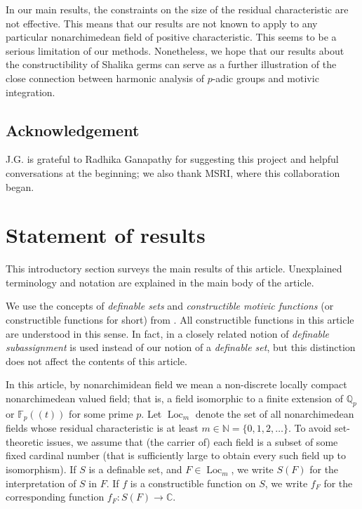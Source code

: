 \documentclass[12pt]{amsart}
\newcommand{\op}[1]{\operatorname{#1}}
\newcommand{\ring}[1]{{\mathbb #1}}
\theoremstyle{plain}
\theoremstyle{definition}
\begin{document}
In our main results, the constraints on the size of the residual
characteristic are not effective.  This means that our results are not
known to apply to any particular nonarchimedean field of positive
characteristic. This seems to be a serious limitation of our methods.
Nonetheless, we hope that our results about the constructibility of
Shalika germs can serve as a further illustration of the close
connection between harmonic analysis of $p$-adic groups and motivic
integration.

\subsection{Acknowledgement} J.G. is grateful to Radhika Ganapathy for
suggesting this project and helpful conversations at the beginning; we
also thank MSRI, where this collaboration began.

\section{Statement of results}


This introductory section surveys the main results of this article.
Unexplained terminology and notation are explained in the main body of
the article.  

We use the concepts of {\it definable sets} and {\it constructible
  motivic functions} (or constructible functions for short) from
\cite{CL}.  All constructible functions in this article are understood
in this sense. In fact, in \cite{CL} a closely related notion of
\emph{definable subassignment} is used instead of our notion of a
\emph{definable set}, but this distinction does not affect the
contents of this article.

In this article, by nonarchimidean field we mean a non-discrete
locally compact nonarchimedean valued field; that is, a field
isomorphic to a finite extension of $\ring{Q}_p$ or $\ring{F}_p(\!(t)\!)$
for some prime $p$.  Let $\op{Loc}_m$ denote the set of all
nonarchimedean fields whose residual characteristic is at least
$m\in \ring{N}=\{0,1,2,\ldots\}$.  To avoid set-theoretic issues, we
assume that (the carrier of) each field is a subset of some fixed
cardinal number (that is sufficiently large to obtain every such field
up to isomorphism).  If $S$ is a definable set, and $F\in \op{Loc}_m$,
we write $S(F)$ for the interpretation of $S$ in $F$.  If $f$ is a
constructible function on $S$, we write $f_F$ for the corresponding
function $f_F:S(F)\to \ring{C}$.
\end{document}
